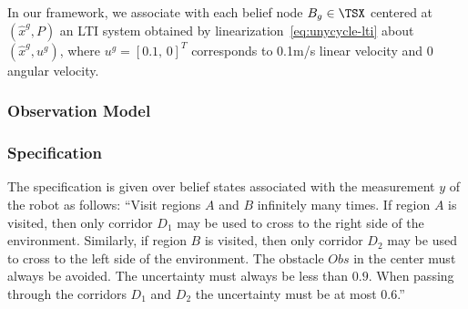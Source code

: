 In our framework, we associate with each belief node
$B_g \in \TSX$ centered at $(\hat{x}^g, P)$ an LTI
system obtained by linearization~\eqref{eq:unycycle-lti}
about $(\hat{x}^g, u^g)$, where $u^g = [0.1, \, 0]^T$
corresponds to 0.1\;m/s linear velocity and 0
angular velocity.

\subsubsection{Observation Model}
\label{sec:bayes}

%

\subsubsection{Specification}
The specification is given over belief states associated
with the measurement $y$ of the robot as follows:
``Visit regions $A$ and $B$ infinitely many times.
If region $A$ is visited, then only corridor $D_1$
may be used to cross to the right side of the environment.
Similarly, if region $B$ is visited, then only corridor
$D_2$ may be used to cross to the left side of the
environment. The obstacle $Obs$ in the center must
always be avoided. The uncertainty must always
be less than $0.9$. When passing through the
corridors $D_1$ and $D_2$ the uncertainty must
be at most $0.6$.''


